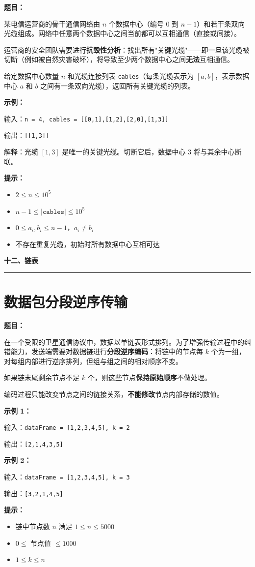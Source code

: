 \documentclass[12pt, a4paper]{article}
\newcommand{\category}[1]{%
  \vspace{1.2cm}
  {\noindent\Large\bfseries #1}
  \vspace{0.2em}\par
  \noindent\rule{\textwidth}{0.8pt}
  \vspace{0.2em}
}
\begin{document}
\noindent\textbf{题目：}

某电信运营商的骨干通信网络由 $n$ 个数据中心（编号 $0$ 到 $n-1$）和若干条双向光缆组成。网络中任意两个数据中心之间当前都可以互相通信（直接或间接）。

运营商的安全团队需要进行\textbf{抗毁性分析}：找出所有"关键光缆"——即一旦该光缆被切断（例如被自然灾害破坏），将导致至少两个数据中心之间\textbf{无法}互相通信。

给定数据中心数量 $n$ 和光缆连接列表 \texttt{cables}（每条光缆表示为 $[a, b]$，表示数据中心 $a$ 和 $b$ 之间有一条双向光缆），返回所有关键光缆的列表。

\textbf{示例：}

输入：\texttt{n = 4, cables = [[0,1],[1,2],[2,0],[1,3]]}

输出：\texttt{[[1,3]]}

解释：光缆 $[1,3]$ 是唯一的关键光缆。切断它后，数据中心 3 将与其余中心断联。

\textbf{提示：}
\begin{itemize}[leftmargin=2em]
  \item $2 \leq n \leq 10^5$
  \item $n - 1 \leq |\texttt{cables}| \leq 10^5$
  \item $0 \leq a_i, b_i \leq n - 1$，$a_i \neq b_i$
  \item 不存在重复光缆，初始时所有数据中心互相可达
\end{itemize}



\category{十二、链表}

\section{数据包分段逆序传输}

\noindent\textbf{题目：}

在一个受限的卫星通信协议中，数据以单链表形式排列。为了增强传输过程中的纠错能力，发送端需要对数据链进行\textbf{分段逆序编码}：将链中的节点每 $k$ 个为一组，对每组内部进行逆序排列，但组与组之间的相对顺序不变。

如果链末尾剩余节点不足 $k$ 个，则这些节点\textbf{保持原始顺序}不做处理。

编码过程只能改变节点之间的链接关系，\textbf{不能修改}节点内部存储的数值。

\textbf{示例 1：}

输入：\texttt{dataFrame = [1,2,3,4,5], k = 2}

输出：\texttt{[2,1,4,3,5]}

\textbf{示例 2：}

输入：\texttt{dataFrame = [1,2,3,4,5], k = 3}

输出：\texttt{[3,2,1,4,5]}

\textbf{提示：}
\begin{itemize}[leftmargin=2em]
  \item 链中节点数 $n$ 满足 $1 \leq n \leq 5000$
  \item $0 \leq$ 节点值 $\leq 1000$
  \item $1 \leq k \leq n$
\end{itemize}
\end{document}

